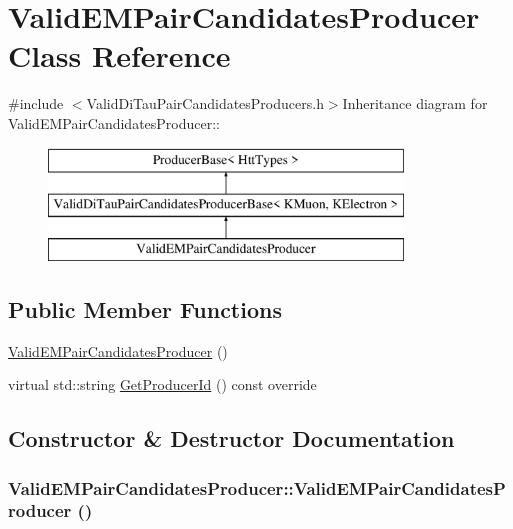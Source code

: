 \hypertarget{classValidEMPairCandidatesProducer}{
\section{ValidEMPairCandidatesProducer Class Reference}
\label{classValidEMPairCandidatesProducer}
}


{\ttfamily \#include $<$ValidDiTauPairCandidatesProducers.h$>$}Inheritance diagram for ValidEMPairCandidatesProducer::\begin{figure}[H]
\begin{center}
\leavevmode
\includegraphics[height=3cm]{classValidEMPairCandidatesProducer}
\end{center}
\end{figure}
\subsection*{Public Member Functions}
\begin{DoxyCompactItemize}
\item 
\hyperlink{classValidEMPairCandidatesProducer_aada74332bbc1c5f2ed975d13fb53f81e}{ValidEMPairCandidatesProducer} ()
\item 
virtual std::string \hyperlink{classValidEMPairCandidatesProducer_a6f5a4c8e1838d24fa276cef1488b29af}{GetProducerId} () const override
\end{DoxyCompactItemize}


\subsection{Constructor \& Destructor Documentation}
\hypertarget{classValidEMPairCandidatesProducer_aada74332bbc1c5f2ed975d13fb53f81e}{
\subsubsection[{ValidEMPairCandidatesProducer}]{\setlength{\rightskip}{0pt plus 5cm}ValidEMPairCandidatesProducer::ValidEMPairCandidatesProducer ()}}
\label{classValidEMPairCandidatesProducer_aada74332bbc1c5f2ed975d13fb53f81e}


